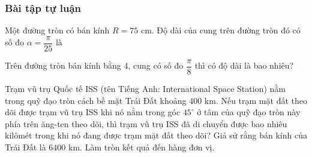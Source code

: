 \subsubsection{Bài tập tự luận}
\begin{bt}%
	Một đường tròn có bán kính $R=75$ cm. Độ dài của cung trên đường tròn đó có số đo $\alpha =\dfrac{\pi}{25}$ là 
\end{bt}
\begin{bt}%
	Trên đường tròn bán kính bằng $4$, cung có số đo $\dfrac{\pi}{8}$ thì có độ dài là bao nhiêu? 
\end{bt}
\begin{bt}%
	Trạm vũ trụ Quốc tế ISS (tên Tiếng Anh: International Space Station) nằm trong quỹ đạo tròn cách bề mặt Trái Đất khoảng $400$ km. Nếu trạm mặt đất theo dõi được trạm vũ trụ ISS khi nó nằm trong góc $45^\circ$ ở tâm của quỹ đạo tròn này phía trên ăng-ten theo dõi, thì trạm vũ trụ ISS đã di chuyển được bao nhiêu kilômét trong khi nó đang được trạm mặt đất theo dõi? Giả sử rằng bán kính của Trái Đất là $6400$ km. Làm tròn kết quả đến hàng đơn vị. 
\end{bt}
